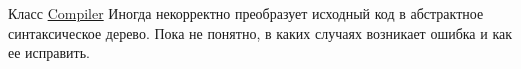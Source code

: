 
\begin{DoxyRefList}
\item[Класс \mbox{\hyperlink{classCompiler}{Compiler}} ]\label{bug__bug000001}%
%
Иногда некорректно преобразует исходный код в абстрактное синтаксическое дерево. Пока не понятно, в каких случаях возникает ошибка и как ее исправить.
\end{DoxyRefList}